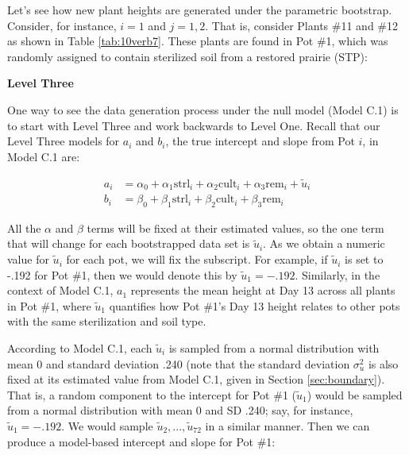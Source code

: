 \documentclass[
]{krantz}
\begin{document}
Let's see how new plant heights are generated under the parametric bootstrap. Consider, for instance, \(i=1\) and \(j=1,2\). That is, consider Plants \#11 and \#12 as shown in Table \ref{tab:10verb7}. These plants are found in Pot \#1, which was randomly assigned to contain sterilized soil from a restored prairie (STP):

\begin{table}

\caption{\label{tab:10verb7}Original data for Plants 11 and 12 from Pot 1.}
\centering
{}
\end{table}

\textbf{Level Three}

One way to see the data generation process under the null model (Model C.1) is to start with Level Three and work backwards to Level One. Recall that our Level Three models for \(a_{i}\) and \(b_{i}\), the true intercept and slope from Pot \(i\), in Model C.1 are:

\begin{align*}
a_{i} & = \alpha_{0}+\alpha_{1}\textrm{strl}_{i}+\alpha_{2}\textrm{cult}_{i}+\alpha_{3}\textrm{rem}_{i}+\tilde{u}_{i} \\
b_{i} & = \beta_{0}+\beta_{1}\textrm{strl}_{i}+\beta_{2}\textrm{cult}_{i}+\beta_{3}\textrm{rem}_{i}
\end{align*}

All the \(\alpha\) and \(\beta\) terms will be fixed at their estimated values, so the one term that will change for each bootstrapped data set is \(\tilde{u}_{i}\). As we obtain a numeric value for \(\tilde{u}_{i}\) for each pot, we will fix the subscript. For example, if \(\tilde{u}_{i}\) is set to -.192 for Pot \#1, then we would denote this by \(\tilde{u}_{1}=-.192\). Similarly, in the context of Model C.1, \(a_{1}\) represents the mean height at Day 13 across all plants in Pot \#1, where \(\tilde{u}_{1}\) quantifies how Pot \#1's Day 13 height relates to other pots with the same sterilization and soil type.

According to Model C.1, each \(\tilde{u}_{i}\) is sampled from a normal distribution with mean 0 and standard deviation .240 (note that the standard deviation \(\sigma^2_{u}\) is also fixed at its estimated value from Model C.1, given in Section \ref{sec:boundary}). That is, a random component to the intercept for Pot \#1 (\(\tilde{u}_{1}\)) would be sampled from a normal distribution with mean 0 and SD .240; say, for instance, \(\tilde{u}_{1}=-.192\). We would sample \(\tilde{u}_{2},...,\tilde{u}_{72}\) in a similar manner. Then we can produce a model-based intercept and slope for Pot \#1:
\end{document}
